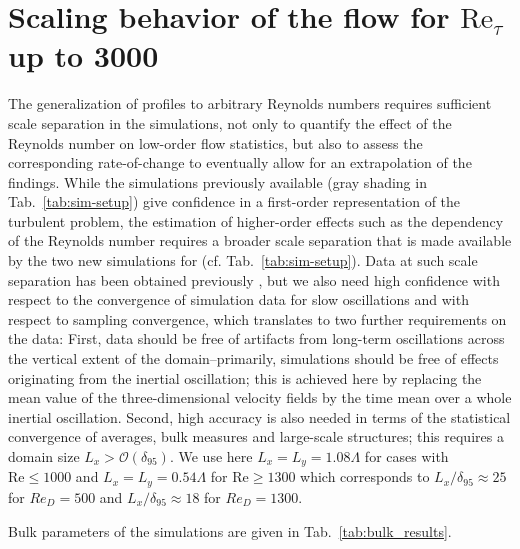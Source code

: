 \documentclass[a4paper,11pt]{amsart}
\newcommand{\RE}{\mathrm{Re}}
\begin{document}
\section{Scaling behavior of the flow for $\RE_\tau$ up to 3000}
\label{sec:scaling}
%
The generalization of profiles to arbitrary Reynolds numbers 
requires sufficient scale separation in the simulations, not only to quantify the effect of
the Reynolds number on low-order flow statistics, but also to assess the corresponding rate-of-change
to eventually allow for an extrapolation of the findings.
%
While the simulations previously available (gray shading in Tab.~\ref{tab:sim-setup})
give confidence in a first-order representation of the turbulent
problem, the estimation of higher-order effects such as the dependency of the Reynolds number requires
a broader scale separation that is made available by the two new simulations for 
(cf. Tab.~\ref{tab:sim-setup}). 
%
%
Data at such scale separation has been obtained previously \citep[cf.][]{spalart:PF2008,spalart:PF2009}, 
but we also need high confidence with respect to the convergence of simulation data for slow oscillations 
and with respect to sampling convergence, which translates to two further requirements on the data: 
%
First, data should be free of artifacts from long-term oscillations across the vertical
extent of the domain--primarily, simulations should be free of effects originating from the
inertial oscillation; this is achieved here by replacing the mean value of the three-dimensional
velocity fields by the time mean over a whole inertial oscillation. 
%
Second, high accuracy is also needed in terms of the statistical convergence of averages,
bulk measures and large-scale structures; this requires a domain size $L_{x} > \mathcal{O}(\delta_{95})$. 
%
We use here $L_{x}=L_{y}=1.08\Lambda$ for cases with $\RE \le 1000$ and
$L_{x}=L_{y}=0.54\Lambda$ for $\RE \ge 1300$ which corresponds to $L_{x}/\delta_{95}\approx 25$ for $Re_D=500$
and $L_{x}/\delta_{95} \approx 18$ for $Re_D=1300$.
%
\par
%
Bulk parameters of the simulations are given in Tab.~\ref{tab:bulk_results}.
\end{document}

